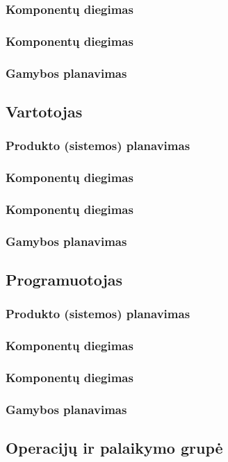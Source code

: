 \documentclass{VUMIFPSkursinis}
\begin{document}
\subsubsection{Komponentų diegimas}
\subsubsection{Komponentų diegimas}
\subsubsection{Gamybos planavimas}
\subsection{Vartotojas}
\subsubsection{Produkto (sistemos) planavimas}
\subsubsection{Komponentų diegimas}
\subsubsection{Komponentų diegimas}
\subsubsection{Gamybos planavimas}
\subsection{Programuotojas}
\subsubsection{Produkto (sistemos) planavimas}
\subsubsection{Komponentų diegimas}
\subsubsection{Komponentų diegimas}
\subsubsection{Gamybos planavimas}
\subsection{Operacijų ir palaikymo grupė}
\end{document}
